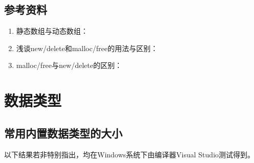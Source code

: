 \documentclass[letterpaper,10pt,english]{sphinxmanual}
\begin{document}
\subsection{参考资料}
\label{\detokenize{cpp/02_array:id8}}\begin{enumerate}
\item {} 
静态数组与动态数组：

\end{enumerate}
\begin{quote}

\end{quote}
\begin{enumerate}
\setcounter{enumi}{1}
\item {} 
浅谈new/delete和malloc/free的用法与区别：

\end{enumerate}
\begin{quote}

\end{quote}
\begin{enumerate}
\setcounter{enumi}{2}
\item {} 
malloc/free与new/delete的区别：

\end{enumerate}
\begin{quote}

\end{quote}


\section{数据类型}
\label{\detokenize{cpp/03_typeSize::doc}}\label{\detokenize{cpp/03_typeSize:id1}}

\subsection{常用内置数据类型的大小}
\label{\detokenize{cpp/03_typeSize:id2}}
以下结果若非特别指出，均在Windows系统下由编译器Visual Studio测试得到。
\end{document}
